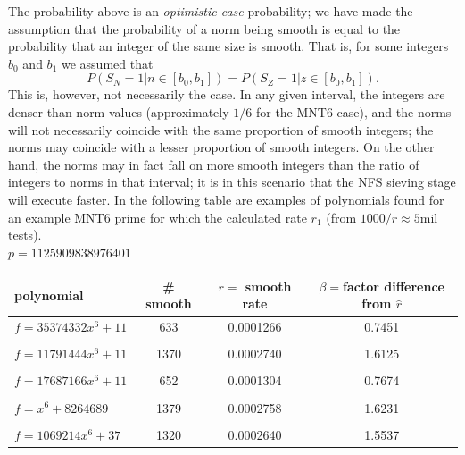 \documentclass[a4paper, 12pt, envcountsect, runningheads]{llncs}
\numberwithin{figure}{section}
\numberwithin{equation}{section}
\begin{document}
The probability above is an {\em optimistic-case} probability; we have made the assumption that the probability of a norm being smooth is equal to the probability that an integer of the same size is smooth. That is, for some integers $b_0$ and $b_1$ we assumed that $$P(S_N=1| n\in[b_0,b_1])=P(S_Z=1| z\in[b_0,b_1]).$$ This is, however, not necessarily the case. In any given interval, the integers are denser than norm values (approximately $1/6$ for the MNT6 case), and the norms will not necessarily coincide with the same proportion of smooth integers; the norms may coincide with a lesser proportion of smooth integers. On the other hand, the norms may in fact fall on more smooth integers than the ratio of integers to norms in that interval; it is in this scenario that the NFS sieving stage will execute faster. In the following table are examples of polynomials found for an example MNT6 prime for which the calculated rate $r_1$ (from $1000/\hat{r}\approx5$mil tests).\\
\newpage
$p=1125909838976401$
\begin{center}
\begin{tabular}{l|ccc}
polynomial & \# smooth & $r=$ smooth rate & $\beta=$factor difference from $\hat{r}$\\
\hline
$f=35374332x^6+11$ &633&0.0001266&0.7451\\
&&&\\
$f=11791444x^6+11$ &1370&0.0002740&1.6125\\
&&&\\
$f=17687166x^6+11$ &652&0.0001304&0.7674\\
&&&\\
$f=x^6+8264689$ &1379&0.0002758&1.6231\\
&&&\\
$f=1069214x^6+37$ &1320&0.0002640&1.5537
\end{tabular}
\end{center}
\vspace{0.5cm}
\end{document}
